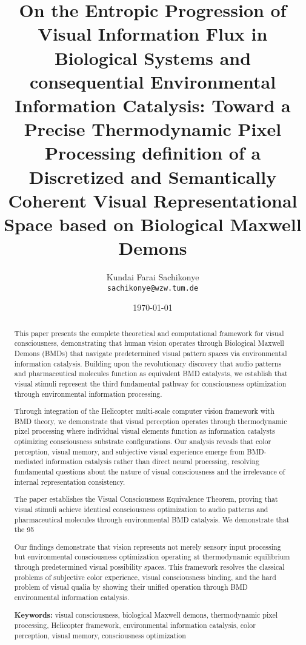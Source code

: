 \documentclass[12pt,a4paper]{article}
\title{On the Entropic Progression of Visual Information Flux in Biological Systems and consequential Environmental Information Catalysis: Toward a Precise Thermodynamic Pixel Processing definition of a Discretized and Semantically Coherent Visual Representational Space based on Biological Maxwell Demons}
\author{Kundai Farai Sachikonye\\
\texttt{sachikonye@wzw.tum.de}}
\date{\today}
\begin{document}
\maketitle

\begin{abstract}
This paper presents the complete theoretical and computational framework for visual consciousness, demonstrating that human vision operates through Biological Maxwell Demons (BMDs) that navigate predetermined visual pattern spaces via environmental information catalysis. Building upon the revolutionary discovery that audio patterns and pharmaceutical molecules function as equivalent BMD catalysts, we establish that visual stimuli represent the third fundamental pathway for consciousness optimization through environmental information processing.

Through integration of the Helicopter multi-scale computer vision framework with BMD theory, we demonstrate that visual perception operates through thermodynamic pixel processing where individual visual elements function as information catalysts optimizing consciousness substrate configurations. Our analysis reveals that color perception, visual memory, and subjective visual experience emerge from BMD-mediated information catalysis rather than direct neural processing, resolving fundamental questions about the nature of visual consciousness and the irrelevance of internal representation consistency.

The paper establishes the Visual Consciousness Equivalence Theorem, proving that visual stimuli achieve identical consciousness optimization to audio patterns and pharmaceutical molecules through environmental BMD catalysis. We demonstrate that the 95%

Our findings demonstrate that vision represents not merely sensory input processing but environmental consciousness optimization operating at thermodynamic equilibrium through predetermined visual possibility spaces. This framework resolves the classical problems of subjective color experience, visual consciousness binding, and the hard problem of visual qualia by showing their unified operation through BMD environmental information catalysis.

\textbf{Keywords:} visual consciousness, biological Maxwell demons, thermodynamic pixel processing, Helicopter framework, environmental information catalysis, color perception, visual memory, consciousness optimization
\end{abstract}
\end{document}
